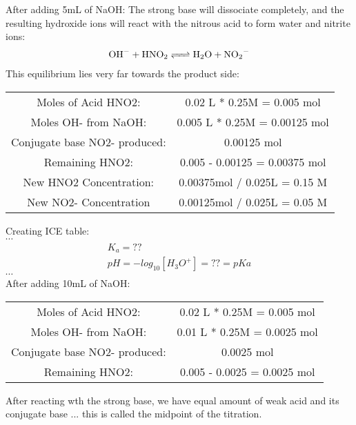 \documentclass{article}  %
\begin{document}
After adding 5mL of NaOH:
\newline
The strong base will dissociate completely, and the resulting hydroxide ions will react with the nitrous acid to form water and nitrite ions:
\begin{equation*}
    \begin{aligned}
        \ce{OH- + HNO2 <=> H2O + NO2-}
    \end{aligned}
\end{equation*}
This equilibrium lies very far towards the product side:
\begin{center}
    \begin{tabular}{ c c }
    Moles of Acid HNO2: & 0.02 L * 0.25M = 0.005 mol \\
    Moles OH- from NaOH: & 0.005 L * 0.25M = 0.00125 mol \\
    Conjugate base NO2- produced: & 0.00125 mol \\
    Remaining HNO2: & 0.005 - 0.00125 = 0.00375 mol \\
    New HNO2 Concentration: & 0.00375mol / 0.025L = 0.15 M \\
    New NO2- Concentration & 0.00125mol / 0.025L  = 0.05 M 
    \end{tabular}    
\end{center}
Creating ICE table: \\
$\cdots$ %
\begin{equation*}
    \begin{aligned}
        K_a = ?? \\
        pH = -log_{10}[H_3O^+] = ?? = pKa
    \end{aligned}
\end{equation*}
$\cdots$ \\ %
After adding 10mL of NaOH:
\begin{center}
    \begin{tabular}{ c c }
    Moles of Acid HNO2: & 0.02 L * 0.25M = 0.005 mol \\
    Moles OH- from NaOH: & 0.01 L * 0.25M = 0.0025 mol \\
    Conjugate base NO2- produced: & 0.0025 mol \\
    Remaining HNO2: & 0.005 - 0.0025 = 0.0025 mol
    \end{tabular}    
\end{center}
After reacting wth the strong base, we have equal amount of weak acid and its conjugate base ... this is called the midpoint of the titration.
\end{document}
